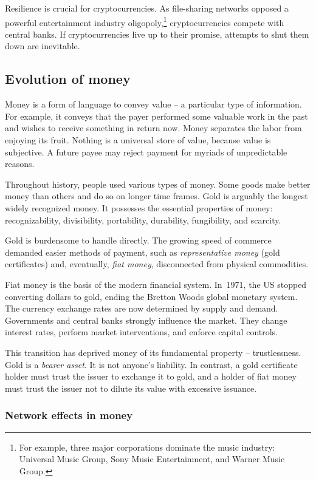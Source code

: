 Resilience is crucial for cryptocurrencies.
As file-sharing networks opposed a powerful entertainment industry oligopoly,\footnote{For example, three major corporations dominate the music industry: Universal Music Group, Sony Music Entertainment, and Warner Music Group.} cryptocurrencies compete with central banks.
If cryptocurrencies live up to their promise, attempts to shut them down are inevitable.


\subsection{Evolution of money}

Money is a form of language to convey value -- a particular type of information.
For example, it conveys that the payer performed some valuable work in the past and wishes to receive something in return now.
Money separates the labor from enjoying its fruit.
Nothing is a universal store of value, because value is subjective.
A future payee may reject payment for myriads of unpredictable reasons.

Throughout history, people used various types of money.
Some goods make better money than others and do so on longer time frames.
Gold is arguably the longest widely recognized money.
It possesses the essential properties of money: recognizability, divisibility, portability, durability, fungibility, and scarcity.

Gold is burdensome to handle directly.
The growing speed of commerce demanded easier methods of payment, such as \textit{representative money} (gold certificates) and, eventually, \textit{fiat money}, disconnected from physical commodities.

Fiat money is the basis of the modern financial system.
In~1971, the US stopped converting dollars to gold, ending the Bretton Woods global monetary system.
The currency exchange rates are now determined by supply and demand.
Governments and central banks strongly influence the market.
They change interest rates, perform market interventions, and enforce capital controls.

This transition has deprived money of its fundamental property -- trustlessness.
Gold is a \textit{bearer asset}.
It is not anyone's liability.
In contrast, a gold certificate holder must trust the issuer to exchange it to gold, and a holder of fiat money must trust the issuer not to dilute its value with excessive issuance.


\subsubsection*{Network effects in money}


